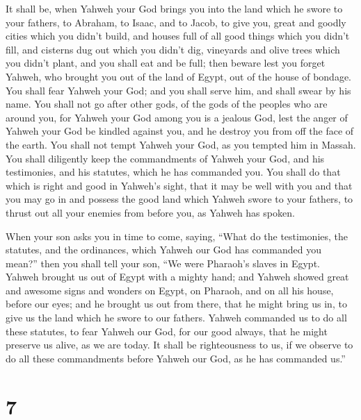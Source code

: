  It shall be, when Yahweh your God brings you into the
land which he swore to your fathers, to Abraham, to Isaac, and to Jacob,
to give you, great and goodly cities which you didn't build,
 and houses full of all good things which you didn't
fill, and cisterns dug out which you didn't dig, vineyards and olive
trees which you didn't plant, and you shall eat and be full;
 then beware lest you forget Yahweh, who brought you out
of the land of Egypt, out of the house of bondage.  You
shall fear Yahweh your God; and you shall serve him, and shall swear by
his name.  You shall not go after other gods, of the gods
of the peoples who are around you,  for Yahweh your God
among you is a jealous God, lest the anger of Yahweh your God be kindled
against you, and he destroy you from off the face of the earth.
 You shall not tempt Yahweh your God, as you tempted him
in Massah.  You shall diligently keep the commandments of
Yahweh your God, and his testimonies, and his statutes, which he has
commanded you.  You shall do that which is right and good
in Yahweh's sight, that it may be well with you and that you may go in
and possess the good land which Yahweh swore to your fathers,
 to thrust out all your enemies from before you, as
Yahweh has spoken.

 When your son asks you in time to come, saying, ``What
do the testimonies, the statutes, and the ordinances, which Yahweh our
God has commanded you mean?''  then you shall tell your
son, ``We were Pharaoh's slaves in Egypt. Yahweh brought us out of Egypt
with a mighty hand;  and Yahweh showed great and awesome
signs and wonders on Egypt, on Pharaoh, and on all his house, before our
eyes;  and he brought us out from there, that he might
bring us in, to give us the land which he swore to our fathers.
 Yahweh commanded us to do all these statutes, to fear
Yahweh our God, for our good always, that he might preserve us alive, as
we are today.  It shall be righteousness to us, if we
observe to do all these commandments before Yahweh our God, as he has
commanded us.''

\hypertarget{section-6}{%
\section{7}\label{section-6}}

